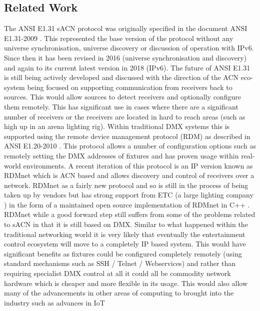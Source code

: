 \documentclass[11pt,a4paper]{article}
\begin{document}
\subsection{Related Work}
The ANSI E1.31 sACN protocol was originally specified in the document ANSI E1.31-2009 \cite{ANSI_E1.31_2009}. This represented the base version of the protocol without any universe synchronisation, universe discovery or discussion of operation with IPv6. Since then it has been revised in 2016 (universe synchronisation and discovery) \cite{ANSI_E1.31_2016} and again to its current latest version in 2018 (IPv6). The future of ANSI E1.31 is still being actively developed and discussed \cite{WHAT_COMES_AFTER_SACN} with the direction of the ACN eco-system being focused on supporting communication from receivers back to sources. This would allow sources to detect receivers and optionally configure them remotely. This has significant use in cases where there are a significant number of receivers or the receivers are located in hard to reach areas (such as high up in an arena lighting rig). Within traditional DMX systems this is supported using the remote device management protocol (RDM) as described in ANSI E1.20-2010 \cite{ANSI_E1.20_2010}. This protocol allows a number of configuration options such as remotely setting the DMX addresses of fixtures and has proven usage within real-world environments. A recent iteration of this protocol is an IP version known as RDMnet \cite{ANSI_E1.33_2019} which is ACN based and allows discovery and control of receivers over a network. RDMnet as a fairly new protocol and so is still in the process of being taken up by vendors but has strong support from ETC (a large lighting company \cite{ETC}) in the form of a maintained open source implementation of RDMnet in C++ \cite{ANSI_E1.33_IMPL}. RDMnet while a good forward step still suffers from some of the problems related to sACN in that it is still based on DMX. Similar to what happened within the traditional networking world it is very likely that eventually the entertainment control ecosystem will move to a completely IP based system. This would have significant benefits as fixtures could be configured completely remotely (using standard mechanisms such as SSH / Telnet / Webservices) and rather than requiring specialist DMX control at all it could all be commodity network hardware which is cheaper and more flexible in its usage. This would also allow many of the advancements in other areas of computing to brought into the industry such as advances in IoT\\
\end{document}
